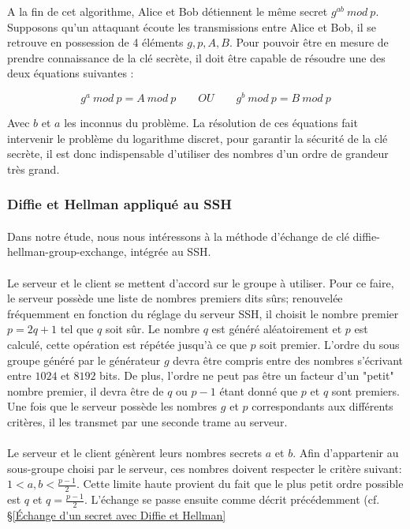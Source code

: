 A la fin de cet algorithme, Alice et Bob détiennent le même secret $g^{ab} \: mod \: p$.\\
Supposons qu'un attaquant écoute les transmissions entre Alice et Bob, il se retrouve en possession de 4 éléments $g,p,A,B$. Pour pouvoir être en mesure de prendre connaissance de la clé secrète, il doit être capable de résoudre une des deux équations suivantes :

\[g^a \: mod \: p=A \: mod \: p \qquad OU \qquad g^b \: mod \: p=B \: mod \: p\]

Avec $b$ et $a$ les inconnus du problème. La résolution de ces équations fait intervenir le problème du logarithme discret, pour garantir la sécurité de la clé secrète, il est donc indispensable d'utiliser des nombres d'un ordre de grandeur très grand.

\subsubsection{Diffie et Hellman appliqué au SSH}
\paragraph{}
Dans notre étude, nous nous intéressons à la méthode d'échange de clé {\ttfamily diffie-hellman-group-exchange}, intégrée au SSH.

\paragraph{}
Le serveur et le client se mettent d'accord sur le groupe à utiliser. Pour ce faire, le serveur possède une liste de nombres premiers dits sûrs; renouvelée fréquemment en fonction du réglage du serveur SSH, il choisit le nombre premier $p=2q+1$ tel que $q$ soit sûr. Le nombre $q$ est généré aléatoirement et $p$ est calculé, cette opération est répétée jusqu'à ce que $p$ soit premier\cite{provos_openssh_nodate}. L'ordre du sous groupe généré par le générateur $g$ devra être compris entre des nombres s'écrivant entre $1024$ et $8192$ bits. De plus, l'ordre ne peut pas être un facteur d'un "petit" nombre premier, il devra être de $q$ ou $p-1$ étant donné que $p$ et $q$ sont premiers. Une fois que le serveur possède les nombres $g$ et $p$ correspondants aux différents critères, il les transmet par une seconde trame au serveur\cite{friedl_echange_nodate}.

\paragraph{}
Le serveur et le client génèrent leurs nombres secrets $a$ et $b$. Afin d'appartenir au sous-groupe choisi par le serveur, ces nombres doivent respecter le critère suivant: $1<a,b<\frac{p-1}{2}$. Cette limite haute provient du fait que le plus petit ordre possible est $q$ et $q=\frac{p-1}{2}$\cite{friedl_echange_nodate}. L'échange se passe ensuite comme décrit précédemment (cf. §\ref{Échange d'un secret avec Diffie et Hellman}
